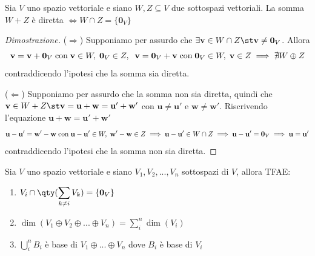    \vspace{10pt}
    \begin{lemma}
        Sia $V$ uno spazio vettoriale e siano $W, Z \subseteq V$ due sottospazi vettoriali. La somma $W + Z$ è diretta $\iff W \cap Z = \{\mathbf{0}_V\}$
    \end{lemma}
    \begin{proof}[Dimostrazione]
        ($\Rightarrow$)
        Supponiamo per assurdo che $\exists \mathbf{v} \in W \cap Z \st \mathbf{v} \neq \mathbf{0}_V$. Allora
        \[
            \mathbf{v} = \mathbf{v} + \mathbf{0}_V \; \textnormal{con} \; \mathbf{v} \in W, \; \mathbf{0}_V \in Z, \;\; \mathbf{v} = \mathbf{0}_V + \mathbf{v} \; \textnormal{con} \; \mathbf{0}_V \in W, \; \mathbf{v} \in Z \implies \nexists W \oplus Z
        \]
        contraddicendo l'ipotesi che la somma sia diretta.

        \vspace{5pt}
        ($\Leftarrow$)
        Supponiamo per assurdo che la somma non sia diretta, quindi che $\mathbf{v} \in W + Z \st \mathbf{v} = \mathbf{u} + \mathbf{w} = \mathbf{u'} + \mathbf{w'}$ con $\mathbf{u} \neq \mathbf{u'}$ e $\mathbf{w} \neq \mathbf{w'}$. Riscrivendo l'equazione $\mathbf{u} + \mathbf{w} = \mathbf{u'} + \mathbf{w'}$
        \[
            \mathbf{u} - \mathbf{u'} = \mathbf{w'} - \mathbf{w} \; \textnormal{con} \; \mathbf{u} - \mathbf{u'} \in W, \; \mathbf{w'} - \mathbf{w} \in Z \implies \mathbf{u} - \mathbf{u'} \in W \cap Z \implies \mathbf{u} - \mathbf{u'} = \mathbf{0}_V \implies \mathbf{u} = \mathbf{u'}
        \]
        contraddicendo l'ipotesi che la somma non sia diretta.
    \end{proof}

    \vspace{10pt}
    \begin{theorem}
        Sia $V$ uno spazio vettoriale e siano $V_1, V_2, ..., V_n$ sottospazi di $V$, allora TFAE:
        \begin{enumerate}[label=(\Roman*)]
            \item $V_{i} \cap \qty(\displaystyle \sum_{k \neq i} V_{k}) = \{\mathbf{0}_{V}\}$
            \item $\dim(V_1 \oplus V_2 \oplus ... \oplus V_n) =  \sum_{i}^{n} \dim(V_i)$
            \item $\bigcup_{i}^{n} B_i$ è base di $V_1 \oplus ... \oplus V_n$ dove $B_{i}$ è base di $V_{i}$
        \end{enumerate}
    \end{theorem}

